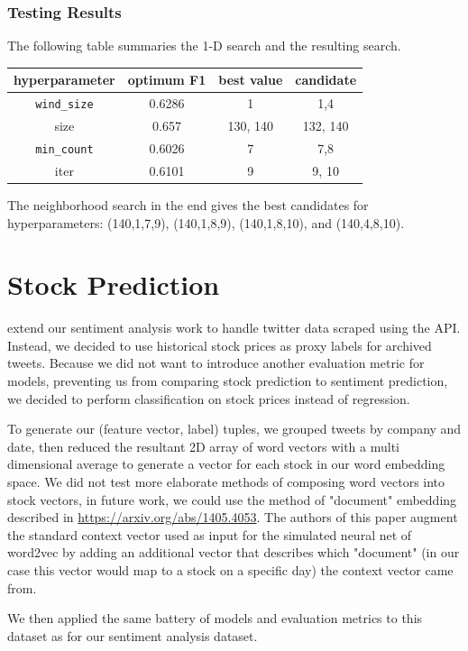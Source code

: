 \documentclass[11pt,a4paper]{article}
\begin{document}
\subsubsection{Testing Results}
The following table summaries the 1-D search and the resulting search. 
\begin{tabular}{|c|c|c|c|}
	\hline 
	hyperparameter & optimum F1 & best value & candidate \\
	\hline 
	\texttt{wind\_size} &  0.6286 & 1 & 1,4\\ 
	\hline 
	size & 0.657 & 130, 140  & 132, 140 \\
	\hline 
	\texttt{min\_count} & 0.6026 & 7 & 7,8 \\
	\hline 
	iter & 0.6101 & 9 & 9, 10 \\
	\hline 
\end{tabular}
The neighborhood search in the end gives the best candidates for hyperparameters: (140,1,7,9), (140,1,8,9), (140,1,8,10), and (140,4,8,10).

\section{Stock Prediction} 
extend our sentiment analysis work to handle twitter data scraped using the API.  Instead, we decided to use historical stock prices as proxy labels for archived tweets.  Because we did not want to introduce another evaluation metric for models, preventing us from comparing stock prediction to sentiment prediction, we decided to perform classification on stock prices instead of regression.  
\par
To generate our (feature vector, label) tuples, we grouped tweets by company and date, then reduced the resultant 2D array of word vectors with a multi dimensional average to generate a vector for each stock in our word embedding space.  We did not test more elaborate methods of composing word vectors into stock vectors, in future work, we could use the method of "document" embedding described in \url{https://arxiv.org/abs/1405.4053}.  The authors of this paper augment the standard context vector used as input for the simulated neural net of word2vec by adding an additional vector that describes which "document" (in our case this vector would map to a stock on a specific day) the context vector came from.
\par
We then applied the same battery of models and evaluation metrics to this dataset as for our sentiment analysis dataset.
\par
\end{document}
